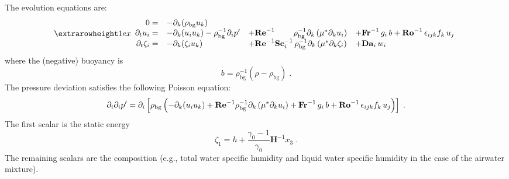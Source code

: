 The evolution equations are:
\begin{equation}
\setlength{\extrarowheight}{1ex}
\begin{array}{rlll}
  0 =&
  -\partial_k(\rho_\mathrm{bg}u_k)   & \\
  \partial_t  u_i =& 
  -\partial_k ( u_i u_k )-\rho_\mathrm{bg}^{-1}\partial_i p' &
  +\mathrm{\bf Re}^{-1}\qquad\;\rho_\mathrm{bg}^{-1}\partial_k \left( \mu^{*} \partial_k u_i\right) &
  +\mathrm{\bf Fr}^{-1}\, g_i\,b+\mathrm{\bf Ro}^{-1}\,\epsilon_{ijk} f_k\,u_j  \\
  \partial_t \zeta_i =&
  -\partial_k (\zeta_i u_k) &
  + \mathrm{\bf Re}^{-1}\mathrm{\bf Sc}_i^{-1}\, \rho_\mathrm{bg}^{-1}\partial_k \left( \mu^{*}\partial_k\zeta_i\right) &+ \mathrm{\bf Da}_i\,w_i
\end{array}
\end{equation}
where the (negative) buoyancy is
\begin{equation}
  b=\rho_\mathrm{bg}^{-1}(\rho-\rho_\mathrm{bg}) \;.
\end{equation}
The pressure deviation satisfies the following Poisson equation:
\begin{equation}
  \partial_i\partial_ip'=\partial_i\left[\rho_\mathrm{bg}\left(
-\partial_k ( u_i u_k )+\mathrm{\bf Re}^{-1}\rho_\mathrm{bg}^{-1}\partial_k \left( \mu^{*} \partial_k u_i\right) +\mathrm{\bf Fr}^{-1}\, g_i\,b+\mathrm{\bf Ro}^{-1}\,\epsilon_{ijk} f_k\,u_j  
\right)\right]\;.
\end{equation}
The first scalar is the static energy
\begin{equation}
  \zeta_1 = h + \frac{\gamma_0-1}{\gamma_0}\mathbf{H}^{-1}x_3 \;.
\end{equation}
The remaining scalars are the composition (e.g., total water specific humidity and liquid water specific humidity in the case of the airwater mixture).